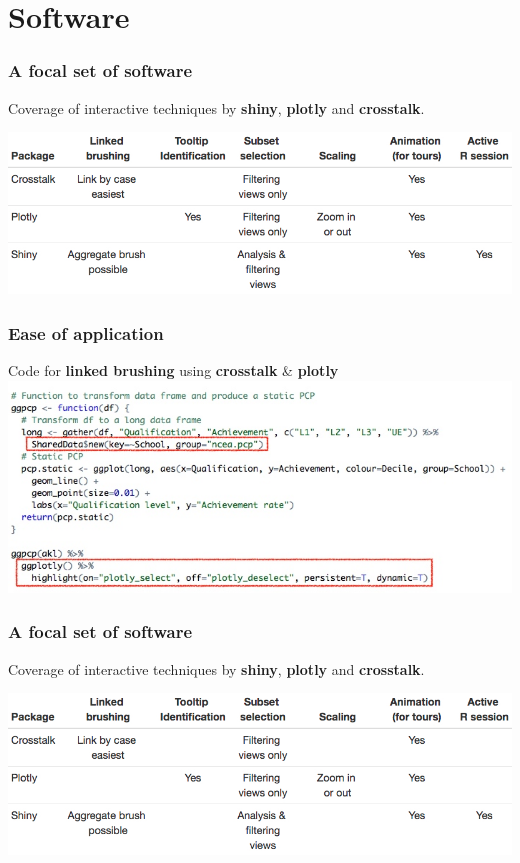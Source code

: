 \documentclass{beamer}
\begin{document}
\section{Software}
\label{sec:software}

\begin{frame}
		\frametitle{A focal set of software}
		Coverage of interactive techniques by \textbf{shiny}, \textbf{plotly} and \textbf{crosstalk}.
		\begin{center}
			\includegraphics[scale=0.37]{files/table.jpeg}
		\end{center}
\end{frame}

\begin{frame}
\frametitle{Ease of application}
Code for \textbf{linked brushing} using \textbf{crosstalk} \& \textbf{plotly} 
\includegraphics[scale=0.46]{files/code2.jpeg}
\end{frame}

\begin{frame}
\frametitle{A focal set of software}
Coverage of interactive techniques by \textbf{shiny}, \textbf{plotly} and \textbf{crosstalk}.
\begin{center}
	\includegraphics[scale=0.37]{files/table.jpeg}
\end{center}
\end{frame}
\end{document}
